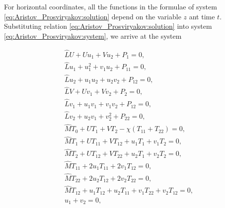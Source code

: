  

For horizontal coordinates, all the functions in the formulae of system \eqref{eq:Aristov_Prosviryakov:solution}  depend on the variable $z$  ant time $t.$ Substituting relation \eqref{eq:Aristov_Prosviryakov:solution} into system \eqref{eq:Aristov_Prosviryakov:system}, we arrive at the system

\begin{gather}

\hat{L}U+Uu_1+Vu_2+P_1=0,

\\

\hat{L}u_1+u^{2}_1+v_1u_2+P_{11}=0,

\\

\hat{L}u_2+u_1u_2+u_2v_2+P_{12}=0,

\\

\hat{L}V+Uv_1+Vv_2+P_{2}=0,

\\

\hat{L}v_1+u_1v_1+v_1v_2+P_{12}=0,

\\

\hat{L}v_2+u_2v_1+v^{2}_2+P_{22}=0,

\\

       \label{eq:Aristov_Prosviryakov:main system }

\hat{M}T_0+UT_1+VT_2-\chi\left(T_{11}+T_{22}\right)=0,

\\

\hat{M}T_1+UT_{11}+VT_{12}+u_1T_1+v_1T_2=0,

\\

\hat{M}T_2+UT_{12}+VT_{22}+u_2T_1+v_2T_2=0,

\\

\hat{M}T_{11}+2u_1T_{11}+2v_1T_{12}=0,

\\

\hat{M}T_{22}+2u_2T_{12}+2v_2T_{22}=0,

\\

\hat{M}T_{12}+u_1T_{12}+u_2T_{11}+v_1T_{22}+v_2T_{12}=0,

\\

u_1+v_2=0,

\\


\end{gather}

